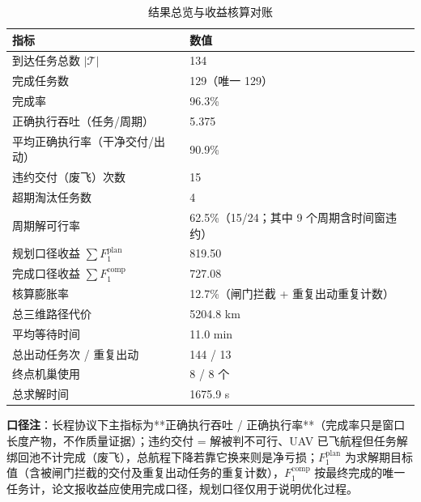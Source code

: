 \documentclass[a4paper,11pt]{article}
\begin{document}
\begin{table}[htbp]\centering
\caption{结果总览与收益核算对账}
\label{tab:exp01-outcome}
\begin{tabular}{ll}
\toprule
指标 & 数值 \\
\midrule
到达任务总数 $|\mathcal{T}|$ & 134 \\
完成任务数 & 129（唯一 129） \\
完成率 & 96.3\% \\
正确执行吞吐（任务/周期） & 5.375 \\
平均正确执行率（干净交付/出动） & 90.9\% \\
违约交付（废飞）次数 & 15 \\
超期淘汰任务数 & 4 \\
周期解可行率 & 62.5\%（15/24；其中 9 个周期含时间窗违约） \\
规划口径收益 $\sum F_1^{\mathrm{plan}}$ & 819.50 \\
完成口径收益 $\sum F_1^{\mathrm{comp}}$ & 727.08 \\
核算膨胀率 & 12.7\%（闸门拦截 + 重复出动重复计数） \\
总三维路径代价 & 5204.8 km \\
平均等待时间 & 11.0 min \\
总出动任务次 / 重复出动 & 144 / 13 \\
终点机巢使用 & 8 / 8 个 \\
总求解时间 & 1675.9 s \\
\bottomrule
\end{tabular}

\vspace{2pt}\parbox{0.92\linewidth}{\footnotesize \textbf{口径注}：长程协议下主指标为**正确执行吞吐 / 正确执行率**（完成率只是窗口长度产物，不作质量证据）；违约交付 = 解被判不可行、UAV 已飞航程但任务解绑回池不计完成（废飞），总航程下降若靠它换来则是净亏损；$F_1^{\mathrm{plan}}$ 为求解期目标值（含被闸门拦截的交付及重复出动任务的重复计数），$F_1^{\mathrm{comp}}$ 按最终完成的唯一任务计，论文报收益应使用完成口径，规划口径仅用于说明优化过程。}
\end{table}
\end{document}
